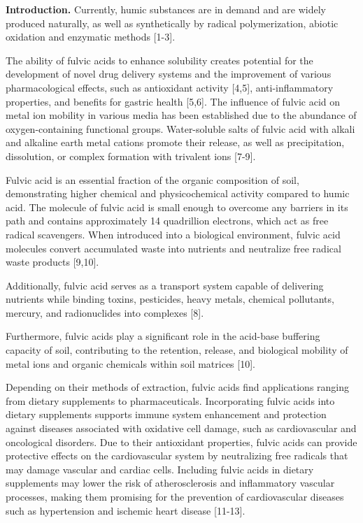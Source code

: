 \begin{multicols}{2}
{\bfseries Introduction.} Currently, humic substances are in demand and are
widely produced naturally, as well as synthetically by radical
polymerization, abiotic oxidation and enzymatic methods {[}1-3{]}.

The ability of fulvic acids to enhance solubility creates potential for
the development of novel drug delivery systems and the improvement of
various pharmacological effects, such as antioxidant activity {[}4,5{]},
anti-inflammatory properties, and benefits for gastric health {[}5,6{]}.
The influence of fulvic acid on metal ion mobility in various media has
been established due to the abundance of oxygen-containing functional
groups. Water-soluble salts of fulvic acid with alkali and alkaline
earth metal cations promote their release, as well as precipitation,
dissolution, or complex formation with trivalent ions {[}7-9{]}.

Fulvic acid is an essential fraction of the organic composition of soil,
demonstrating higher chemical and physicochemical activity compared to
humic acid. The molecule of fulvic acid is small enough to overcome any
barriers in its path and contains approximately 14 quadrillion
electrons, which act as free radical scavengers. When introduced into a
biological environment, fulvic acid molecules convert accumulated waste
into nutrients and neutralize free radical waste products {[}9,10{]}.

Additionally, fulvic acid serves as a transport system capable of
delivering nutrients while binding toxins, pesticides, heavy metals,
chemical pollutants, mercury, and radionuclides into complexes {[}8{]}.

Furthermore, fulvic acids play a significant role in the acid-base
buffering capacity of soil, contributing to the retention, release, and
biological mobility of metal ions and organic chemicals within soil
matrices {[}10{]}.

Depending on their methods of extraction, fulvic acids find applications
ranging from dietary supplements to pharmaceuticals. Incorporating
fulvic acids into dietary supplements supports immune system enhancement
and protection against diseases associated with oxidative cell damage,
such as cardiovascular and oncological disorders. Due to their
antioxidant properties, fulvic acids can provide protective effects on
the cardiovascular system by neutralizing free radicals that may damage
vascular and cardiac cells. Including fulvic acids in dietary
supplements may lower the risk of atherosclerosis and inflammatory
vascular processes, making them promising for the prevention of
cardiovascular diseases such as hypertension and ischemic heart disease
{[}11-13{]}.


\end{multicols}
